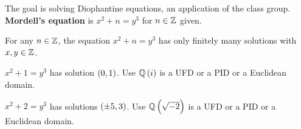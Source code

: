 
The goal is solving Diophantine equations, an application of the class group. \textbf{Mordell's equation} is $ x^2 + n = y^3 $ for $ n \in \mathbb{Z} $ given.

\begin{theorem}
For any $ n \in \mathbb{Z} $, the equation $ x^2 + n = y^3 $ has only finitely many solutions with $ x, y \in \mathbb{Z} $.
\end{theorem}

\begin{example*}
$ x^2 + 1 = y^3 $ has solution $ \br{0, 1} $. Use $ \Q\br{i} $ is a UFD or a PID or a Euclidean domain.
\end{example*}

\begin{example*}
$ x^2 + 2 = y^3 $ has solutions $ \br{\pm 5, 3} $. Use $ \Q\br{\sqrt{-2}} $ is a UFD or a PID or a Euclidean domain.
\end{example*}

